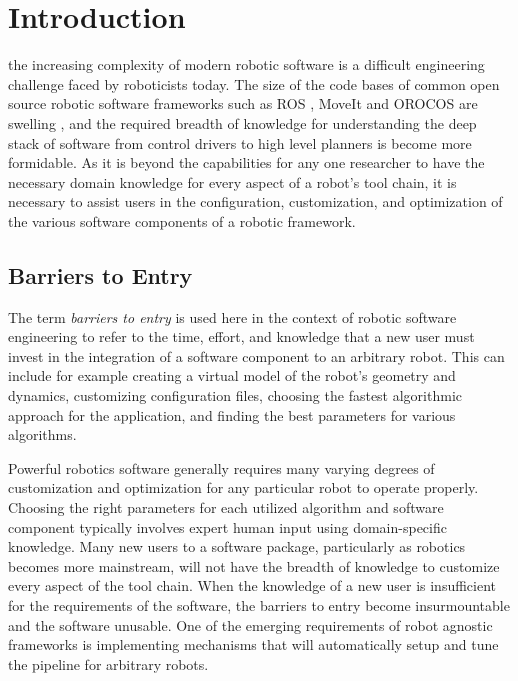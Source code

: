\documentclass[10pt,journal,compsoc]{joser1}
\begin{document}
\section{Introduction}
 {the increasing complexity of modern robotic software is a difficult engineering challenge faced by roboticists today. The size of the code bases of common open source robotic software frameworks such as ROS \cite{quigley2009ros}, MoveIt \cite{moveit} and OROCOS \cite{bruyninckx2001open} are swelling \cite{makarenko2007benefits}, and the required breadth of knowledge for understanding the deep stack of software from control drivers to high level planners is become more formidable. As it is beyond the capabilities for any one researcher to have the necessary domain knowledge for every aspect of a robot's tool chain, it is necessary to assist users in the configuration, customization, and optimization of the various software components of a robotic framework. 

\subsection{Barriers to Entry}

The term \textit{barriers to entry} is used here in the context of robotic software engineering to refer to the time, effort, and knowledge that a new user must invest in the integration of a software component to an arbitrary robot. This can include for example creating a virtual model of the robot's geometry and dynamics, customizing configuration files, choosing the fastest algorithmic approach for the application, and finding the best parameters for various algorithms. 

Powerful robotics software generally requires many varying degrees of customization and optimization for any particular robot to operate properly. Choosing the right parameters for each utilized algorithm and software component typically involves expert human input using domain-specific knowledge. Many new users to a software package, particularly as robotics becomes more mainstream, will not have the breadth of knowledge to customize every aspect of the tool chain. When the knowledge of a new user is insufficient for the requirements of the software, the barriers to entry become insurmountable and the software unusable. One of the emerging requirements of robot agnostic frameworks is implementing mechanisms that will automatically setup and tune the pipeline for arbitrary robots.

}
\end{document}
